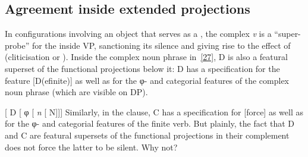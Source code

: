 \documentclass[output=paper]{langsci/langscibook}
\begin{document}
\begin{refcontext}
\section{Agreement inside extended projections}
\label{sec:16.6}

In configurations involving an object that serves as a , the
complex \emph{v} is a \enquote{super-probe} for the  inside VP,
sanctioning its silence and giving rise to the effect of 
(cliticisation or ). Inside the complex noun phrase
in~\eqref{27}, D is also a featural superset of the functional projections below
it: D has a specification for the feature [D(efinite)] as well as for the
φ{}- and categorial features of the complex noun phrase (which are
visible on DP).

\ea  {}[ D [ φ{}
[ \emph{n}\tss{\{[+N]\}} [ N]]]\label{27}
\z
Similarly, in the clause, C has a specification for [force] as well as for the
φ{}- and categorial features of the finite verb. But plainly, the fact
that D and C are featural supersets of the functional projections in their
complement does not force the latter to be silent. Why not?


\end{refcontext}
\end{document}

